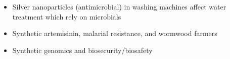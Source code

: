 \begin{itemize}
\begin{itemize}
\begin{itemize}
\begin{itemize}
            \item Silver nanoparticles (antimicrobial) in washing machines affect water treatment which rely on microbials

            \item Synthetic artemisinin, malarial resistance, and wormwood farmers

            \item Synthetic genomics and biosecurity/biosafety

          \end{itemize}

      \end{itemize}

    \end{itemize}

\end{itemize}



